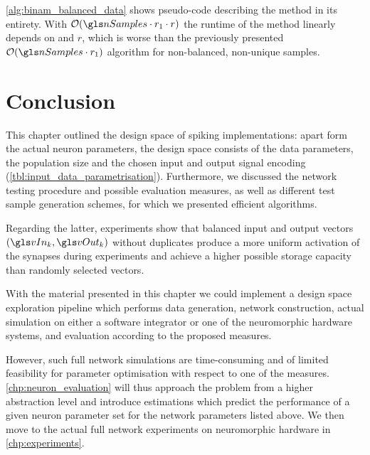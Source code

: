 \cref{alg:binam_balanced_data} shows pseudo-code describing the method in its entirety. With $\mathcal{O}(\nSamples \cdot r_1 \cdot r)$ the runtime of the method linearly depends on \nSamples and $r$, which is worse than the previously presented $\mathcal{O}(\nSamples \cdot r_1)$ algorithm for non-balanced, non-unique samples.

\section{Conclusion}

This chapter outlined the design space of spiking \BiNAM implementations: apart form the actual neuron parameters, the design space consists of the data parameters, the population size and the chosen input and output signal encoding (\cf \cref{tbl:input_data_parametrisation}). Furthermore, we discussed the network testing procedure and possible evaluation measures, as well as different test sample generation schemes, for which we presented efficient algorithms.

Regarding the latter, experiments show that balanced input and output vectors $(\vIn_k, \vOut_k)$ without duplicates produce a more uniform activation of the synapses during experiments and achieve a higher possible storage capacity than randomly selected vectors.

With the material presented in this chapter we could implement a design space exploration pipeline which performs data generation, network construction, actual simulation on either a software integrator or one of the neuromorphic hardware systems, and evaluation according to the proposed measures.

However, such full network simulations are time-consuming and of limited feasibility for parameter optimisation with respect to one of the measures. \cref{chp:neuron_evaluation} will thus approach the problem from a higher abstraction level and introduce estimations which predict the performance of a given neuron parameter set \nParams for the network parameters listed above. We then move to the actual full network experiments on neuromorphic hardware in \cref{chp:experiments}.
